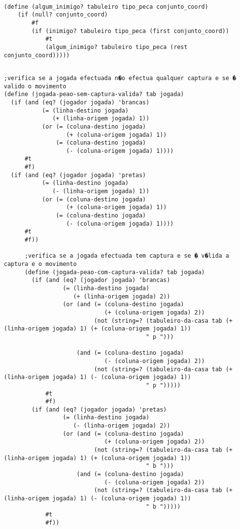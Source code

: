 \begin{lstlisting}[basicstyle=\ttfamily, caption="example"]

(define (algum_inimigo? tabuleiro tipo_peca conjunto_coord)
    (if (null? conjunto_coord)
        #f
        (if (inimigo? tabuleiro tipo_peca (first conjunto_coord))
            #t
            (algum_inimigo? tabuleiro tipo_peca (rest conjunto_coord)))))
          \end{lstlisting}


\begin{lstlisting}[basicstyle=\ttfamily, caption="example"]

;verifica se a jogada efectuada n�o efectua qualquer captura e se � valido o movimento
(define (jogada-peao-sem-captura-valida? tab jogada)
  (if (and (eq? (jogador jogada) 'brancas)
           (= (linha-destino jogada)
              (+ (linha-origem jogada) 1))
           (or (= (coluna-destino jogada)
                  (+ (coluna-origem jogada) 1))
               (= (coluna-destino jogada)
                  (- (coluna-origem jogada) 1))))
      #t
      #f)
  (if (and (eq? (jogador jogada) 'pretas)
           (= (linha-destino jogada)
              (- (linha-origem jogada) 1))
           (or (= (coluna-destino jogada)
                  (+ (coluna-origem jogada) 1))
               (= (coluna-destino jogada)
                  (- (coluna-origem jogada) 1))))
      #t
      #f))

      ;verifica se a jogada efectuada tem captura e se � v�lida a captura e o movimento
      (define (jogada-peao-com-captura-valida? tab jogada)
        (if (and (eq? (jogador jogada) 'brancas)
                 (= (linha-destino jogada)
                    (+ (linha-origem jogada) 2))
                 (or (and (= (coluna-destino jogada)
                             (+ (coluna-origem jogada) 2))
                          (not (string=? (tabuleiro-da-casa tab (+ (linha-origem jogada) 1) (+ (coluna-origem jogada) 1))
                                         " p ")))

                     (and (= (coluna-destino jogada)
                             (- (coluna-origem jogada) 2))
                          (not (string=? (tabuleiro-da-casa tab (+ (linha-origem jogada) 1) (- (coluna-origem jogada) 1))
                                         " p ")))))
            #t
            #f)
        (if (and (eq? (jogador jogada) 'pretas)
                 (= (linha-destino jogada)
                    (- (linha-origem jogada) 2))
                 (or (and (= (coluna-destino jogada)
                             (+ (coluna-origem jogada) 2))
                          (not (string=? (tabuleiro-da-casa tab (+ (linha-origem jogada) 1) (+ (coluna-origem jogada) 1))
                                         " b ")))
                     (and (= (coluna-destino jogada)
                             (- (coluna-origem jogada) 2))
                          (not (string=? (tabuleiro-da-casa tab (+ (linha-origem jogada) 1) (- (coluna-origem jogada) 1))
                                         " b ")))))
            #t
            #f))

          \end{lstlisting}

